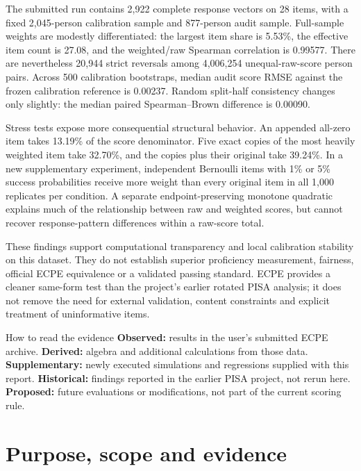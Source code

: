 \documentclass[11pt,a4paper,oneside,headings=normal,parskip=half]{scrreprt}
\begin{document}
The submitted run contains 2,922 complete response vectors on 28 items, with a fixed 2,045-person calibration sample and 877-person audit sample. Full-sample weights are modestly differentiated: the largest item share is 5.53\%, the effective item count is 27.08, and the weighted/raw Spearman correlation is 0.99577. There are nevertheless 20,944 strict reversals among 4,006,254 unequal-raw-score person pairs. Across 500 calibration bootstraps, median audit score RMSE against the frozen calibration reference is 0.00237. Random split-half consistency changes only slightly: the median paired Spearman--Brown difference is 0.00090.

Stress tests expose more consequential structural behavior. An appended all-zero item takes 13.19\% of the score denominator. Five exact copies of the most heavily weighted item take 32.70\%, and the copies plus their original take 39.24\%. In a new supplementary experiment, independent Bernoulli items with 1\% or 5\% success probabilities receive more weight than every original item in all 1,000 replicates per condition. A separate endpoint-preserving monotone quadratic explains much of the relationship between raw and weighted scores, but cannot recover response-pattern differences within a raw-score total.

These findings support computational transparency and local calibration stability on this dataset. They do not establish superior proficiency measurement, fairness, official ECPE equivalence or a validated passing standard. ECPE provides a cleaner same-form test than the project's earlier rotated PISA analysis; it does not remove the need for external validation, content constraints and explicit treatment of uninformative items.

\begin{finding}{How to read the evidence}
\textbf{Observed:} results in the user's submitted ECPE archive. \textbf{Derived:} algebra and additional calculations from those data. \textbf{Supplementary:} newly executed simulations and regressions supplied with this report. \textbf{Historical:} findings reported in the earlier PISA project, not rerun here. \textbf{Proposed:} future evaluations or modifications, not part of the current scoring rule.
\end{finding}
\tableofcontents
\clearpage
{}

\chapter{Purpose, scope and evidence}
\end{document}
